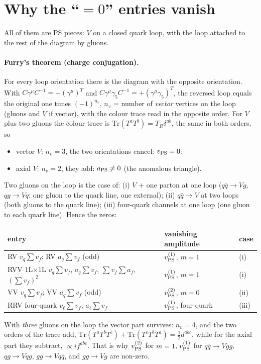 \documentclass[11pt,a4paper]{article}
\newcommand{\tr}{\mathrm{Tr}}
\newcommand{\PS}{_{\rm PS}}
\begin{document}
\section{Why the ``\texorpdfstring{$=0$}{=0}'' entries vanish}\label{sec:zero}

All of them are PS pieces: $V$ on a closed quark loop, with the loop attached to the rest of the diagram by gluons.

\paragraph{Furry's theorem (charge conjugation).} For every loop orientation there is the diagram with the
opposite orientation. With $C\gamma^\mu C^{-1}=-(\gamma^\mu)^T$ and $C\gamma^\mu\gamma_5C^{-1}=+(\gamma^\mu\gamma_5)^T$, the reversed
loop equals the original one times $(-1)^{n_v}$, $n_v$ = number of \emph{vector} vertices on the loop (gluons and
$V$ if vector), with the colour trace read in the opposite order. For $V$ plus two gluons the colour trace is
$\tr(T^aT^b)=T_R\delta^{ab}$, the same in both orders, so
\begin{itemize}
\item vector $V$: $n_v=3$, the two orientations cancel: $v\PS=0$;
\item axial $V$: $n_v=2$, they add: $a\PS\neq0$ (the anomalous triangle).
\end{itemize}
Two gluons on the loop is the case of: (i) $V$ + one parton at one loop ($q\bar q\to Vg$, $qg\to Vq$: one gluon to
the quark line, one external); (ii) $q\bar q\to V$ at two loops (both gluons to the quark line); (iii) four-quark
channels at one loop (one gluon to each quark line). Hence the zeros:
\begin{center}
\small
\begin{tabular}{lll}
\toprule
entry & vanishing amplitude & case \\
\midrule
RV $v_q\sum v_f$; RV $a_q\sum v_f$ (odd) & $v\PS^{(1)}$, $m=1$ & (i) \\
RVV 1L$\times$1L $v_q\sum v_f$, $a_q\sum v_f$, $\sum v_f\sum a_f$, $(\sum v_f)^2$ & $v\PS^{(1)}$, $m=1$ & (i) \\
VV $v_q\sum v_f$; VV $a_q\sum v_f$ (odd) & $v\PS^{(2)}$, $m=0$ & (ii) \\
RRV four-quark $v_\ell\sum v_f$, $a_\ell\sum v_f$ & $v\PS^{(1)}$, four-quark & (iii) \\
\bottomrule
\end{tabular}
\end{center}
With \emph{three} gluons on the loop the vector part survives: $n_v=4$, and the two orders of the trace add,
$\tr(T^aT^bT^c)+\tr(T^cT^bT^a)=\tfrac12d^{abc}$, while for the axial part they subtract, $\propto if^{abc}$. That is why
$v\PS^{(2)}$ for $m=1$, $v\PS^{(1)}$ for $q\bar q\to Vgg$, $qg\to Vqg$, $gg\to Vq\bar q$, and $gg\to Vg$ are non-zero.
\end{document}
